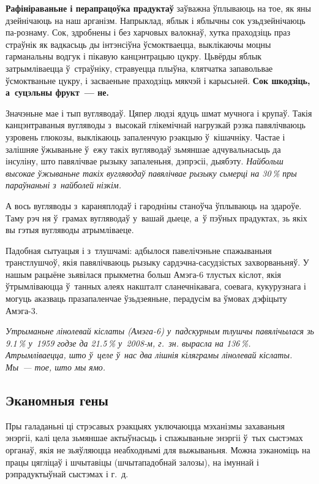\textbf{Рафініраваньне і перапрацоўка прадуктаў} заўважна ўплываюць на тое, як яны дзейнічаюць на наш арганізм. Напрыклад, яблык і яблычны сок узьдзейнічаюць па-рознаму. Сок, здробнены і без харчовых валокнаў, хутка праходзіць праз страўнік як вадкасьць ды інтэнсіўна ўсмоктваецца, выклікаючы моцны гарманальны водгук і пікавую канцэнтрацыю цукру. Цьвёрды яблык затрымліваецца ў~страўніку, стравуецца плыўна, клятчатка запавольвае ўсмоктваньне цукру, і засваеньне праходзіць мякчэй і карысьней. \textbf{Сок шкодзіць, а~суцэльны фрукт~--- не.}

Значэньне мае і тып вугляводаў. Цяпер людзі ядуць шмат мучнога і крупаў. Такія канцэнтраваныя вугляводы з~высокай глікемічнай нагрузкай рэзка павялічваюць узровень глюкозы, выклікаюць запаленчую рэакцыю ў~кішачніку. Частае і залішняе ўжываньне ў~ежу такіх вугляводаў зьмяншае адчувальнасьць да інсуліну, што павялічвае рызыку запаленьня, дэпрэсіі, дыябэту. \emph{Найбольш высокае ўжываньне такіх вугляводаў павялічвае рызыку сьмерці на 30\,\% пры параўнаньні з~найболей нізкім.}

А вось вугляводы з~караняплодаў і гародніны станоўча ўплываюць на здароўе. Таму рэч ня ў~грамах вугляводаў у~вашай дыеце, а~ў пэўных прадуктах, зь якіх вы гэтыя вугляводы атрымліваеце.

Падобная сытуацыя і з~тлушчамі: адбылося павелічэньне спажываньня транстлушчоў, якія павялічваюць рызыку сардэчна-сасудзістых захворваньняў. У нашым рацыёне зьявілася прыкметна больш Амэга-6 тлустых кіслот, якія ўтрымліваюцца ў~танных алеях накшталт сланечнікавага, соевага, кукурузнага і могуць аказваць празапаленчае ўзьдзеяньне, перадусім ва ўмовах дэфіцыту Амэга-3. 

\emph{Утрыманьне лінолевай кіслаты (Амэга-6) у~падскурным тлушчы павялічылася зь 9.1\,\% у~1959 годзе да 21.5\,\% у~2008-м, г.~зн. вырасла на 136\,\%. Атрымліваецца, што ў~целе ў~нас два лішнія кіляграмы лінолевай кіслаты. Мы~--- тое, што мы ямо.}

\subsection*{Эканомныя гены}

Пры галаданьні ці стрэсавых рэакцыях уключаюцца мэханізмы захаваньня энэргіі, калі цела зьмяншае актыўнасьць і спажываньне энэргіі ў~тых сыстэмах органаў, якія не зьяўляюцца неабходнымі для выжываньня. Можна зэканоміць на працы цягліцаў і шчытавіцы (шчытападобнай залозы), на імуннай і рэпрадуктыўнай сыстэмах і г.~д.

